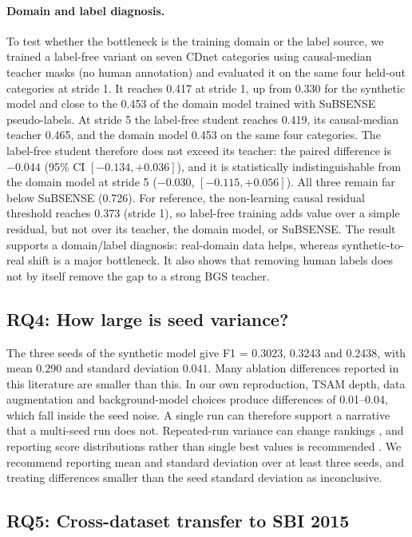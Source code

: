 \documentclass[sn-mathphys-num,iicol]{sn-jnl}
\begin{document}
\paragraph{Domain and label diagnosis.}
To test whether the bottleneck is the training domain or the label source, we
trained a label-free variant on seven CDnet categories using causal-median
teacher masks (no human annotation) and evaluated it on the same four held-out
categories at stride 1. It reaches 0.417 at stride 1, up from 0.330 for the synthetic model and close to
the 0.453 of the domain model trained with SuBSENSE pseudo-labels. At stride 5
the label-free student reaches 0.419, its causal-median teacher 0.465, and the
domain model 0.453 on the same four categories. The label-free student therefore
does not exceed its teacher: the paired difference is $-0.044$ (95\% CI
$[-0.134,+0.036]$), and it is statistically indistinguishable from the domain
model at stride 5 ($-0.030$, $[-0.115,+0.056]$). All three remain far below
SuBSENSE (0.726). For reference, the non-learning causal residual
threshold reaches 0.373 (stride 1), so label-free training adds value over a
simple residual, but not over its teacher, the domain model, or SuBSENSE.
The result supports a domain/label diagnosis: real-domain data helps, whereas synthetic-to-real shift
is a major bottleneck. It also shows that removing human labels does not by
itself remove the gap to a strong BGS teacher.

\subsection{RQ4: How large is seed variance?}\label{sec:rq4}

The three seeds of the synthetic model give F1 = 0.3023, 0.3243 and 0.2438, with
mean $0.290$ and standard deviation $0.041$. Many ablation differences reported
in this literature are smaller than this. In our own reproduction, TSAM depth,
data augmentation and background-model choices produce differences of
0.01--0.04, which fall inside the seed noise. A single run can therefore support
a narrative that a multi-seed run does not. Repeated-run variance can change rankings
\cite{drlmatters2018}, and reporting score distributions rather than single best
values is recommended \cite{scoredist2017,showyourwork2019}. We recommend
reporting mean and standard deviation over at least three seeds, and treating
differences smaller than the seed standard deviation as inconclusive.

\subsection{RQ5: Cross-dataset transfer to SBI 2015}\label{sec:rq5}
\end{document}
